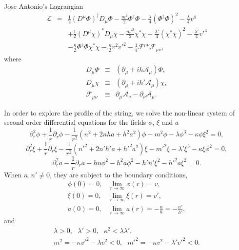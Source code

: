 \documentclass[10pt,a4paper]{article}
\begin{document}
Jose Antonio's Lagrangian 
\begin{eqnarray} 
\mathcal{L} & = & \frac{1}{2}(D^{\mu}\Phi)^{\dagger}D_{\mu}\Phi - \frac{m^2}{2}\Phi^{\dagger}\Phi - \frac{\lambda}{4}(\Phi^{\dagger}\Phi)^2 -\frac{\lambda}{4}v^4   \nonumber\\
 & & +\frac{1}{2}(D^{\mu} \chi)^*D_{\mu} \chi - \frac{m'^2}{2}\chi^*\chi - \frac{\lambda'}{4}(\chi^* \chi)^2 -\frac{\lambda'}{4}v'^4\nonumber \\ 
 & & -\frac{\kappa}{2}\Phi^\dagger\Phi\chi^*\chi  -\frac{\kappa}{2}v^2v'^2 -\frac{1}{4}\mathcal{F}^{\mu\nu}\mathcal{F}_{\mu\nu}, %
\end{eqnarray}
where 
\begin{eqnarray*}
D_{\mu} \Phi & \equiv & (\partial_{\mu} + ih\mathcal{A}_{\mu})\Phi, \\ 
D_{\mu} \chi & \equiv & (\partial_{\mu} + ih'\mathcal{A}_{\mu})\chi, \\
\mathcal{F}_{\mu\nu} & \equiv & \partial_{\mu}\mathcal{A}_{\nu}-\partial_{\nu}\mathcal{A}_{\mu}.%
\end{eqnarray*}

In order to explore the profile of the string, we solve the non-linear system of second order differential equations for the fields $\phi$, $\xi$ and $a$ 
\begin{equation}
	\partial_r^2 \phi + \frac{1}{r} \partial_r \phi- \frac{1}{r^2}\left(n^2+2nha+h^2a^2\right)\phi- m^2 \phi- \lambda \phi^3-\kappa \phi \xi^2 = 0,
\end{equation}
\begin{equation}
	\partial_r^2 \xi + \frac{1}{r} \partial_r \xi - \frac{1}{r^2}\left(n'^2+2n'h' a+h'^2a^2 \right)\xi -m'^2\xi - \lambda' \xi^3 - \kappa \xi \phi^2 = 0 ,
\end{equation}
\begin{equation}
	\partial_r^2a -\frac{1}{r}\partial_r a-hn\phi^2-h^2a\phi^2-h' n'\xi^2 - h'^2 a \xi^2 = 0.  
\end{equation}
When $n,n'\neq 0$, they are subject to the boundary conditions,
\begin{eqnarray}
	\phi(0)=0, & \displaystyle\lim_{r\to\infty}\phi(r) = v, \nonumber \\
	 \xi(0)=0, &  \displaystyle\lim_{r\to\infty}\xi(r) = v', \nonumber  \\
	 a(0)=0, & \displaystyle \lim_{r\to\infty}a(r) = -\frac{n}{h}=-\frac{n'}{h'},
\end{eqnarray}
and
\begin{align}
	\label{eq:constraints}
	\lambda>0, \ \ \ \lambda'>0, \ \ \ \kappa^2 < \lambda \lambda',\nonumber \\
	 m^2 = -\kappa v'^2 - \lambda v^2<0,\ \ \ m'^2 = -\kappa v^2 - \lambda' v'^2<0. 
\end{align}
\end{document}
